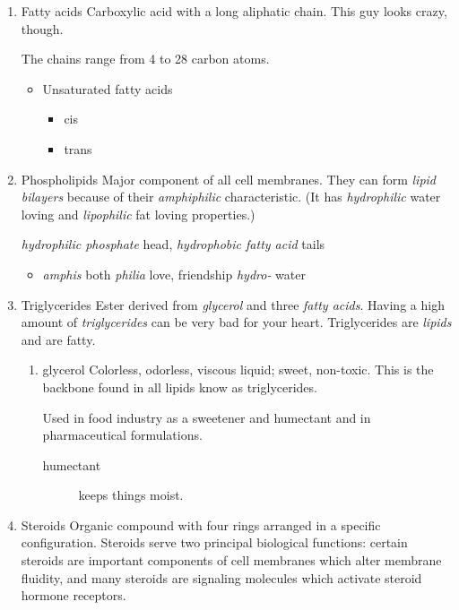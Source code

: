 \documentclass[11pt]{article}
\begin{document}
\begin{enumerate}
\item Fatty acids
\label{sec:org9f7d610}
Carboxylic acid with a long aliphatic chain. This guy looks crazy, though.

The chains range from 4 to 28 carbon atoms.

\begin{itemize}
\item Unsaturated fatty acids
\begin{itemize}
\item cis
\item trans
\end{itemize}
\end{itemize}

\item Phospholipids
\label{sec:orgb206f86}
Major component of all cell membranes. They can form \emph{lipid bilayers}
because of their \emph{amphiphilic} characteristic. (It has \emph{hydrophilic} water
loving and \emph{lipophilic} fat loving properties.) 

\emph{hydrophilic phosphate} head, \emph{hydrophobic fatty acid} tails

\begin{itemize}
\item \emph{amphis} both \emph{philia} love, friendship \emph{hydro-} water
\end{itemize}

\item Triglycerides
\label{sec:org2f5773c}
Ester derived from \emph{glycerol} and three \emph{fatty acids}. Having a high amount
of \emph{triglycerides} can be very bad for your heart. Triglycerides are
\emph{lipids} and are fatty.

\begin{enumerate}
\item glycerol
\label{sec:org9722b49}
Colorless, odorless, viscous liquid; sweet, non-toxic. This is the
backbone found in all lipids know as triglycerides.

Used in food industry as a sweetener and humectant and in pharmaceutical
formulations.

\begin{description}
\item[{humectant}] keeps things moist.
\end{description}
\end{enumerate}

\item Steroids
\label{sec:org1f6dd99}
Organic compound with four rings arranged in a specific configuration.
Steroids serve two principal biological functions: certain steroids are
important components of cell membranes which alter membrane fluidity, and
many steroids are signaling molecules which activate steroid hormone
receptors.


\end{enumerate}
\end{document}
